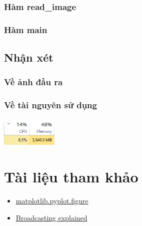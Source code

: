\documentclass{article}
\begin{document}
\subsubsection{Hàm read\_image}
\subsubsection{Hàm main}

\newpage
\subsection{Nhận xét}
\subsubsection{Về ảnh đầu ra}

\subsubsection{Về tài nguyên sử dụng}

\centerline{\includegraphics[width=0.2\textwidth]{image/performance.png}}
\newpage
\section{Tài liệu tham khảo}
\begin{itemize}
    \item \href{https://matplotlib.org/stable/api/_as_gen/matplotlib.pyplot.figure.html}{matplotlib.pyplot.figure}
    \item \href{https://numpy.org/doc/stable/user/basics.broadcasting.html}{Broadcasting explained}
\end{itemize}
\end{document}
